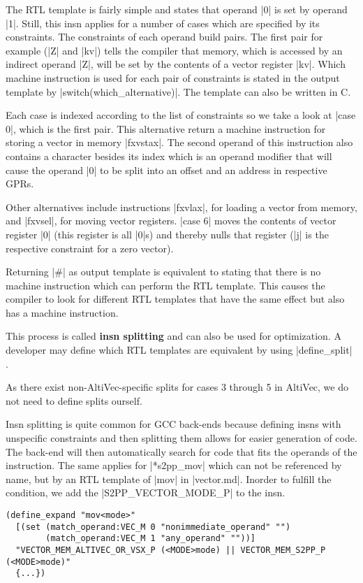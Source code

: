 The RTL template is fairly simple and states that operand |0| is set by operand |1|.
Still, this insn applies for a number of cases which are specified by its constraints.
The constraints of each operand build pairs.
The first pair for example (|Z| and |kv|) tells the compiler that memory, which is accessed by an indirect operand |Z|, will be set by the contents of a vector register |kv|.
Which machine instruction is used for each pair of constraints is stated in the output template by |switch(which_alternative)|.
The template can also be written in C.

Each case is indexed according to the list of constraints so we take a look at |case 0|, which is the first pair.
This alternative return a machine instruction for storing a vector in memory |fxvstax|.
The second operand of this instruction also contains a character besides its index which is an operand modifier \citep[ch.~6.45.2]{GCCint} that will cause the operand |0| to be split into an offset and an address in respective GPRs.

Other alternatives include instructions |fxvlax|, for loading a vector from memory, and |fxvsel|, for moving vector registers.
|case 6| moves the contents of vector register |0| (this register is all |0|s) and thereby nulls that register (|j| is the respective constraint for a zero vector).

Returning |#| as output template is equivalent to stating that there is no machine instruction which can perform the RTL template.
This causes the compiler to look for different RTL templates that have the same effect but also has a machine instruction.

This process is called \textbf{insn splitting} and can also be used for optimization.
A developer may define which RTL templates are equivalent by using |define_split| \citep[16.16]{GCCint}.

As there exist non-AltiVec-specific splits for cases 3 through 5 in AltiVec, we do not need to define splits ourself.

Insn splitting is quite common for GCC back-ends because defining insns with unspecific constraints and then splitting them allows for easier generation of code.
The back-end will then automatically search for code that fits the operands of the instruction.
The same applies for |*s2pp_mov| which can not be referenced by name, but by an RTL template of |mov| in |vector.md|.
Inorder to fulfill the condition, we add the |S2PP_VECTOR_MODE_P| to the insn.
\begin{lstlisting}
(define_expand "mov<mode>"
  [(set (match_operand:VEC_M 0 "nonimmediate_operand" "")
        (match_operand:VEC_M 1 "any_operand" ""))]
  "VECTOR_MEM_ALTIVEC_OR_VSX_P (<MODE>mode) || VECTOR_MEM_S2PP_P (<MODE>mode)"
  {...})
\end{lstlisting}

